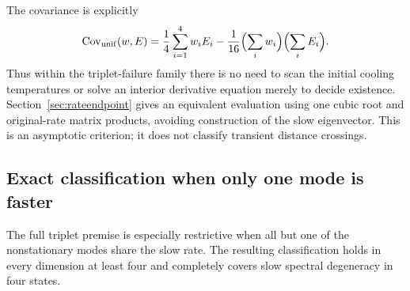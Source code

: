 \documentclass[11pt]{article}
\begin{document}
The covariance is explicitly
\[
\operatorname{Cov}_{\mathrm{unif}}(w,E)
=\frac14\sum_{i=1}^4w_iE_i
-\frac1{16}\Bigl(\sum_iw_i\Bigr)\Bigl(\sum_iE_i\Bigr).
\]
Thus within the triplet-failure family there is no need to scan the initial
cooling temperatures or solve an interior derivative equation merely to
decide existence. Section~\ref{sec:rateendpoint} gives an equivalent
evaluation using one cubic root and original-rate matrix products,
avoiding construction of the slow eigenvector. This is an asymptotic
criterion; it does not classify transient distance crossings.

\subsection{Exact classification when only one mode is faster}
\label{sec:fulltripletdegenerate}
The full triplet premise is especially restrictive when all but one of
the nonstationary modes share the slow rate. The resulting classification
holds in every dimension at least four and completely covers slow
spectral degeneracy in four states.
\end{document}
